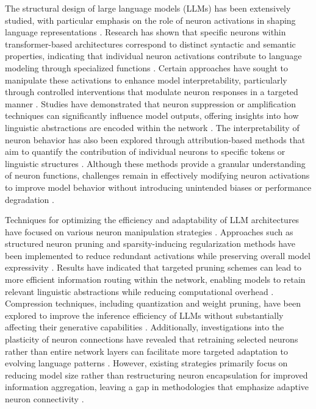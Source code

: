 \documentclass{article}
\begin{document}
The structural design of large language models (LLMs) has been extensively studied, with particular emphasis on the role of neuron activations in shaping language representations \cite{choquet2024exploiting}. Research has shown that specific neurons within transformer-based architectures correspond to distinct syntactic and semantic properties, indicating that individual neuron activations contribute to language modeling through specialized functions \cite{golatkar2024cpr}. Certain approaches have sought to manipulate these activations to enhance model interpretability, particularly through controlled interventions that modulate neuron responses in a targeted manner \cite{sang2024evaluating}. Studies have demonstrated that neuron suppression or amplification techniques can significantly influence model outputs, offering insights into how linguistic abstractions are encoded within the network \cite{higasigi2024novel}. The interpretability of neuron behavior has also been explored through attribution-based methods that aim to quantify the contribution of individual neurons to specific tokens or linguistic structures \cite{nabovina2024neural, soikao2024novel}. Although these methods provide a granular understanding of neuron functions, challenges remain in effectively modifying neuron activations to improve model behavior without introducing unintended biases or performance degradation \cite{ pagacheva2024dynamic}. 

Techniques for optimizing the efficiency and adaptability of LLM architectures have focused on various neuron manipulation strategies \cite{nademort2024innovative}. Approaches such as structured neuron pruning and sparsity-inducing regularization methods have been implemented to reduce redundant activations while preserving overall model expressivity \cite{bernar2024exploring}. Results have indicated that targeted pruning schemes can lead to more efficient information routing within the network, enabling models to retain relevant linguistic abstractions while reducing computational overhead \cite{geline2024linguistic}. Compression techniques, including quantization and weight pruning, have been explored to improve the inference efficiency of LLMs without substantially affecting their generative capabilities \cite{shan2024benchmarking}. Additionally, investigations into the plasticity of neuron connections have revealed that retraining selected neurons rather than entire network layers can facilitate more targeted adaptation to evolving language patterns \cite{ sefeni2024game}. However, existing strategies primarily focus on reducing model size rather than restructuring neuron encapsulation for improved information aggregation, leaving a gap in methodologies that emphasize adaptive neuron connectivity \cite{korbanov2024hierarchical}. 
\end{document}

